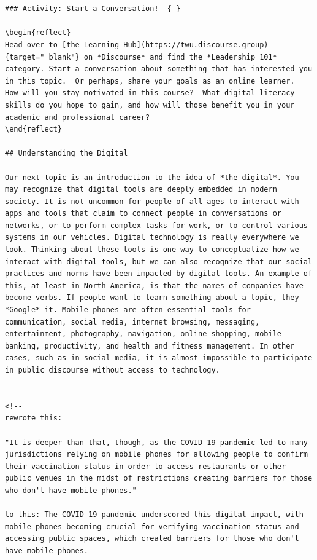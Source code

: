 \documentclass[
]{book}
\theoremstyle{definition}
\theoremstyle{definition}
\theoremstyle{definition}
\theoremstyle{definition}
\theoremstyle{remark}
\begin{document}
\begin{verbatim}


### Activity: Start a Conversation!  {-}

\begin{reflect}
Head over to [the Learning Hub](https://twu.discourse.group){target="_blank"} on *Discourse* and find the *Leadership 101* category. Start a conversation about something that has interested you in this topic.  Or perhaps, share your goals as an online learner.  How will you stay motivated in this course?  What digital literacy skills do you hope to gain, and how will those benefit you in your academic and professional career?
\end{reflect}

## Understanding the Digital

Our next topic is an introduction to the idea of *the digital*. You may recognize that digital tools are deeply embedded in modern society. It is not uncommon for people of all ages to interact with apps and tools that claim to connect people in conversations or networks, or to perform complex tasks for work, or to control various systems in our vehicles. Digital technology is really everywhere we look. Thinking about these tools is one way to conceptualize how we interact with digital tools, but we can also recognize that our social practices and norms have been impacted by digital tools. An example of this, at least in North America, is that the names of companies have become verbs. If people want to learn something about a topic, they *Google* it. Mobile phones are often essential tools for communication, social media, internet browsing, messaging, entertainment, photography, navigation, online shopping, mobile banking, productivity, and health and fitness management. In other cases, such as in social media, it is almost impossible to participate in public discourse without access to technology. 


<!--
rewrote this:

"It is deeper than that, though, as the COVID-19 pandemic led to many jurisdictions relying on mobile phones for allowing people to confirm their vaccination status in order to access restaurants or other public venues in the midst of restrictions creating barriers for those who don't have mobile phones."

to this: The COVID-19 pandemic underscored this digital impact, with mobile phones becoming crucial for verifying vaccination status and accessing public spaces, which created barriers for those who don't have mobile phones. 


\end{verbatim}
\end{document}
